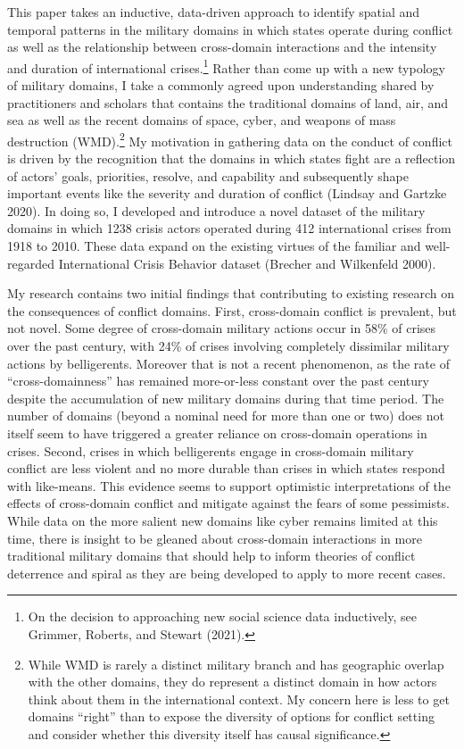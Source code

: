 \documentclass[
]{article}
\begin{document}
This paper takes an inductive, data-driven approach to identify spatial and temporal patterns in the military domains in which states operate during conflict as well as the relationship between cross-domain interactions and the intensity and duration of international crises.\footnote{On the decision to approaching new social science data inductively, see Grimmer, Roberts, and Stewart (2021).} Rather than come up with a new typology of military domains, I take a commonly agreed upon understanding shared by practitioners and scholars that contains the traditional domains of land, air, and sea as well as the recent domains of space, cyber, and weapons of mass destruction (WMD).\footnote{While WMD is rarely a distinct military branch and has geographic overlap with the other domains, they do represent a distinct domain in how actors think about them in the international context. My concern here is less to get domains ``right'' than to expose the diversity of options for conflict setting and consider whether this diversity itself has causal significance.} My motivation in gathering data on the conduct of conflict is driven by the recognition that the domains in which states fight are a reflection of actors' goals, priorities, resolve, and capability and subsequently shape important events like the severity and duration of conflict (Lindsay and Gartzke 2020). In doing so, I developed and introduce a novel dataset of the military domains in which 1238 crisis actors operated during 412 international crises from 1918 to 2010. These data expand on the existing virtues of the familiar and well-regarded International Crisis Behavior dataset (Brecher and Wilkenfeld 2000).

My research contains two initial findings that contributing to existing research on the consequences of conflict domains. First, cross-domain conflict is prevalent, but not novel. Some degree of cross-domain military actions occur in 58\% of crises over the past century, with 24\% of crises involving completely dissimilar military actions by belligerents. Moreover that is not a recent phenomenon, as the rate of ``cross-domainness'' has remained more-or-less constant over the past century despite the accumulation of new military domains during that time period. The number of domains (beyond a nominal need for more than one or two) does not itself seem to have triggered a greater reliance on cross-domain operations in crises. Second, crises in which belligerents engage in cross-domain military conflict are less violent and no more durable than crises in which states respond with like-means. This evidence seems to support optimistic interpretations of the effects of cross-domain conflict and mitigate against the fears of some pessimists. While data on the more salient new domains like cyber remains limited at this time, there is insight to be gleaned about cross-domain interactions in more traditional military domains that should help to inform theories of conflict deterrence and spiral as they are being developed to apply to more recent cases.
\end{document}
